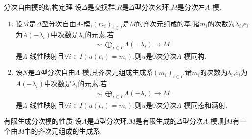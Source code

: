 \begin{proposition}{分次自由摸的结构定理}{}
	设$\Delta$是交换群,$R$是$\Delta$型分次幺环,$M$是分次左$A$-模.
	\begin{enumerate}
		\item 设$M$是$\Delta$型分次自由$A$-模,$\left(m_{i}\right)_{i\in I}$是$M$的齐次元组成的基,诸$m_{i}$的次数为$\lambda_{i}$,$e_{i}$为$A\left(-\lambda_{i}\right)$中次数是$\lambda_{i}$的元素.若
		\begin{align*}
			u:\bigoplus\limits_{i\in I}A\left(-\lambda_{i}\right)\to M
		\end{align*}
		是$A$-线性映射且$\forall i\in I\left(u\left(e_{i}\right)=m_{i}\right)$,则$u$是$0$次分次$A$-模同构.
		\item 设$N$是$\Delta$型分次自由$A$-模,其齐次元组成生成系$\left(m_{i}\right)_{i\in I}$,诸$m_{i}$的次数为$\lambda_{i}$,$e_{i}$为$A\left(-\lambda_{i}\right)$中次数是$\lambda_{i}$的元素.若
		\begin{align*}
			u:\bigoplus\limits_{i\in I}A\left(-\lambda_{i}\right)\to M
		\end{align*}
		是$A$-线性映射且$\forall i\in I\left(u\left(e_{i}\right)=m_{i}\right)$,则$u$是$0$次分次$A$-模同态和满射.
	\end{enumerate}
\end{proposition}

\begin{corollary}{有限生成分次模的性质}{}
	设$A$是$\Delta$型分次环,$M$是有限生成的$\Delta$型分次$A$-模,则$M$有一个由$M$中的齐次元组成的生成系.
\end{corollary}

